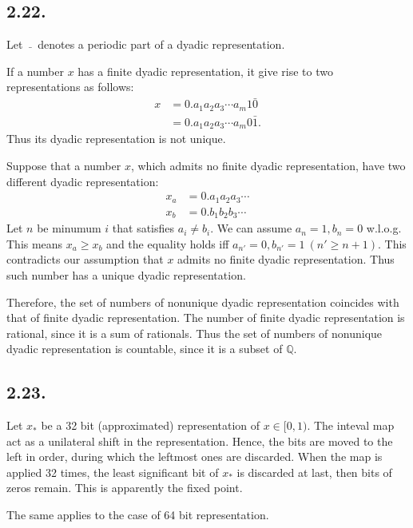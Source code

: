 \documentclass[a4paper,11pt,fleqn]{article}
\begin{document}
\hruleskip

\subsection{2.22.}
Let $\ \bar{} \ $ denotes a periodic part of a dyadic representation.  

If a number $x$ has a finite dyadic representation, it give rise to two representations as follows: 
\begin{align}
    x & = 0.a_1a_2a_3\cdots a_m 1 \bar{0} \nonumber \\
      & = 0.a_1a_2a_3\cdots a_m 0 \bar{1}. 
\end{align}
Thus its dyadic representation is not unique. 

Suppose that a number $x$, which admits no finite dyadic representation, have two different dyadic representation: 
\begin{align}
    x_a & = 0.a_1a_2a_3\cdots \nonumber \\
    x_b  & = 0.b_1b_2b_3\cdots  
\end{align}
Let $n$ be minumum $i$ that satisfies $a_i \neq b_i$. We can assume $a_n = 1, b_n = 0$ w.l.o.g. This means $x_a \ge x_b$ and the equality holds iff $a_{n'}=0, b_{n'} = 1 \ (n' \ge n+1)$. This contradicts our assumption that $x$ admits no finite dyadic representation. Thus such number has a unique dyadic representation. 

Therefore, the set of numbers of nonunique dyadic representation coincides with that of finite dyadic representation. The number of finite dyadic representation is rational, since it is a sum of rationals. Thus the set of numbers of nonunique dyadic representation is countable, since it is a subset of $\mathbb{Q}$. 
\hruleskip

\subsection{2.23.}

Let $x_*$ be a 32 bit (approximated) representation of $x\in [0,1)$. The inteval map act as a unilateral shift in the representation. Hence, the bits are moved to the left in order, during which the leftmost ones are discarded. When the map is applied 32 times, the least significant bit of $x_*$ is discarded at last, then bits of zeros remain. This is apparently the fixed point. 

The same applies to the case of 64 bit representation. 
\hruleskip
\end{document}
